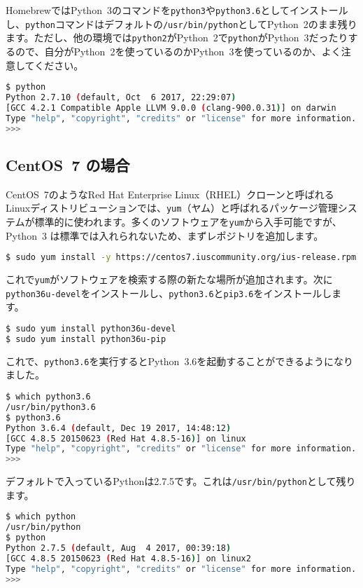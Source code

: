 HomebrewではPython~3のコマンドを\texttt{python3}や\texttt{python3.6}としてインストールし、\texttt{python}コマンドはデフォルトの\texttt{/usr/bin/python}としてPython~2のまま残ります。ただし、他の環境では\texttt{python2}がPython~2で\texttt{python}がPython~3だったりするので、自分がPython~2を使っているのかPython~3を使っているのか、よく注意してください。

\begin{lstlisting}[language=bash]
$ python
Python 2.7.10 (default, Oct  6 2017, 22:29:07) 
[GCC 4.2.1 Compatible Apple LLVM 9.0.0 (clang-900.0.31)] on darwin
Type "help", "copyright", "credits" or "license" for more information.
>>> 
\end{lstlisting}

\subsection{CentOS~7 の場合}

CentOS~7のようなRed Hat Enterprise Linux（RHEL）クローンと呼ばれるLinuxディストリビューションでは、\texttt{yum}（ヤム）と呼ばれるパッケージ管理システムが標準的に使われます。多くのソフトウェアを\texttt{yum}から入手可能ですが、Python~3 は標準では入れられないため、まずレポジトリを追加します。

\begin{lstlisting}[language=bash]
$ sudo yum install -y https://centos7.iuscommunity.org/ius-release.rpm
\end{lstlisting}

これで\texttt{yum}がソフトウェアを検索する際の新たな場所が追加されます。次に\texttt{python36u-devel}をインストールし、\texttt{python3.6}と\texttt{pip3.6}をインストールします。

\begin{lstlisting}[language=bash]
$ sudo yum install python36u-devel
$ sudo yum install python36u-pip
\end{lstlisting}

これで、\texttt{python3.6}を実行するとPython~3.6を起動することができるようになりました。
\begin{lstlisting}[language=bash]
$ which python3.6
/usr/bin/python3.6
$ python3.6
Python 3.6.4 (default, Dec 19 2017, 14:48:12) 
[GCC 4.8.5 20150623 (Red Hat 4.8.5-16)] on linux
Type "help", "copyright", "credits" or "license" for more information.
>>> 
\end{lstlisting}

デフォルトで入っているPythonは2.7.5です。これは\texttt{/usr/bin/python}として残ります。
\begin{lstlisting}[language=bash]
$ which python
/usr/bin/python
$ python
Python 2.7.5 (default, Aug  4 2017, 00:39:18) 
[GCC 4.8.5 20150623 (Red Hat 4.8.5-16)] on linux2
Type "help", "copyright", "credits" or "license" for more information.
>>> 
\end{lstlisting}

